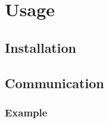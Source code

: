 \documentclass[12pt]{article}
\begin{document}
\section{Usage}
\subsection{Installation}
\subsection{Communication}
\subsubsection{Example}






\end{document}
